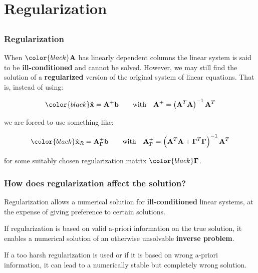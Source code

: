 \documentclass[compress]{beamer}
\newcommand{\black}[1]{{\color{black}#1}}
\renewcommand{\emph}[1]{\textbf{\black{#1}}}
\newcommand{\beq}[1]{\[\black{#1}\]}
\begin{document}
\section{Regularization}
\subsection*{}

\begin{frame}[fragile]
\frametitle{Regularization}

When $\black{\A}$ has linearly dependent columns the linear system is said to be \emph{ill-conditioned} and cannot be solved. However, we may still find the solution of a \emph{regularized} version of the original system of linear equations. That is, instead of using:


\beq{
\hat{\x} = \A^+\b		\qquad \textrm{with}\quad \A^+ = \left(\A^T\A\right)^{-1}\A^T
}

we are forced to use something like:

\beq{
\hat{\x}_R = \A^+_{\Gammam}\b		\qquad \textrm{with}\quad \A^+_{\Gammam}= \left(\A^T\A + \Gammam^T\Gammam\right)^{-1}\A^T
}

for some suitably chosen regularization matrix $\black{\Gammam}$.

\end{frame}


\begin{frame}[fragile]
\frametitle{How does regularization affect the solution?}

Regularization allows a numerical solution for \emph{ill-conditioned} linear systems, at the expense of giving preference to certain solutions.

\vspace{.5cm}
If regularization is based on valid a-priori information on the true solution, it enables a numerical solution of an otherwise unsolvable \emph{inverse problem}.

\vspace{.5cm}
If a too harsh regularization is used or if it is based on wrong a-priori information, it can lead to a numerically stable but completely wrong solution.


\end{frame}


\end{document}
